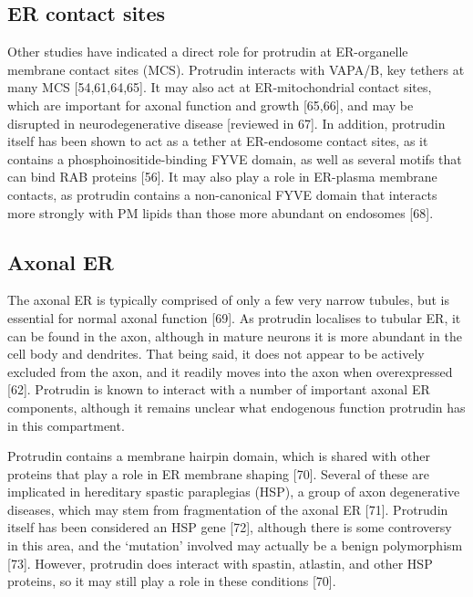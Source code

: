 \documentclass[
  12pt,
  a4paper,
]{book}
\begin{document}
\hypertarget{er-contact-sites}{%
\subsection{ER contact sites}\label{er-contact-sites}}

Other studies have indicated a direct role for protrudin at ER-organelle membrane contact sites (MCS). Protrudin interacts with VAPA/B, key tethers at many MCS {[}54,61,64,65{]}. It may also act at ER-mitochondrial contact sites, which are important for axonal function and growth {[}65,66{]}, and may be disrupted in neurodegenerative disease {[}reviewed in 67{]}. In addition, protrudin itself has been shown to act as a tether at ER-endosome contact sites, as it contains a phosphoinositide-binding FYVE domain, as well as several motifs that can bind RAB proteins {[}56{]}. It may also play a role in ER-plasma membrane contacts, as protrudin contains a non-canonical FYVE domain that interacts more strongly with PM lipids than those more abundant on endosomes {[}68{]}.

\hypertarget{intro-ptdn-axonalER}{%
\subsection{Axonal ER}\label{intro-ptdn-axonalER}}

The axonal ER is typically comprised of only a few very narrow tubules, but is essential for normal axonal function {[}69{]}. As protrudin localises to tubular ER, it can be found in the axon, although in mature neurons it is more abundant in the cell body and dendrites. That being said, it does not appear to be actively excluded from the axon, and it readily moves into the axon when overexpressed {[}62{]}. Protrudin is known to interact with a number of important axonal ER components, although it remains unclear what endogenous function protrudin has in this compartment.

Protrudin contains a membrane hairpin domain, which is shared with other proteins that play a role in ER membrane shaping {[}70{]}. Several of these are implicated in hereditary spastic paraplegias (HSP), a group of axon degenerative diseases, which may stem from fragmentation of the axonal ER {[}71{]}. Protrudin itself has been considered an HSP gene {[}72{]}, although there is some controversy in this area, and the `mutation' involved may actually be a benign polymorphism {[}73{]}. However, protrudin does interact with spastin, atlastin, and other HSP proteins, so it may still play a role in these conditions {[}70{]}.
\end{document}
